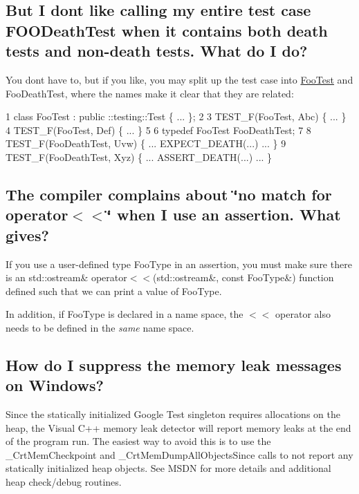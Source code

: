 \subsection*{But I don\textquotesingle{}t like calling my entire test case F\+O\+O\+Death\+Test when it contains both death tests and non-\/death tests. What do I do?}

You don\textquotesingle{}t have to, but if you like, you may split up the test case into {\ttfamily \hyperlink{class_foo_test}{Foo\+Test}} and {\ttfamily Foo\+Death\+Test}, where the names make it clear that they are related\+:


\begin{DoxyCode}
1 class FooTest : public ::testing::Test \{ ... \};
2 
3 TEST\_F(FooTest, Abc) \{ ... \}
4 TEST\_F(FooTest, Def) \{ ... \}
5 
6 typedef FooTest FooDeathTest;
7 
8 TEST\_F(FooDeathTest, Uvw) \{ ... EXPECT\_DEATH(...) ... \}
9 TEST\_F(FooDeathTest, Xyz) \{ ... ASSERT\_DEATH(...) ... \}
\end{DoxyCode}


\subsection*{The compiler complains about \char`\"{}no match for \textquotesingle{}operator$<$$<$\textquotesingle{}\char`\"{} when I use an assertion. What gives?}

If you use a user-\/defined type {\ttfamily Foo\+Type} in an assertion, you must make sure there is an {\ttfamily std\+::ostream\& operator$<$$<$(std\+::ostream\&, const Foo\+Type\&)} function defined such that we can print a value of {\ttfamily Foo\+Type}.

In addition, if {\ttfamily Foo\+Type} is declared in a name space, the {\ttfamily $<$$<$} operator also needs to be defined in the {\itshape same} name space.

\subsection*{How do I suppress the memory leak messages on Windows?}

Since the statically initialized Google Test singleton requires allocations on the heap, the Visual C++ memory leak detector will report memory leaks at the end of the program run. The easiest way to avoid this is to use the {\ttfamily \+\_\+\+Crt\+Mem\+Checkpoint} and {\ttfamily \+\_\+\+Crt\+Mem\+Dump\+All\+Objects\+Since} calls to not report any statically initialized heap objects. See M\+S\+DN for more details and additional heap check/debug routines.


